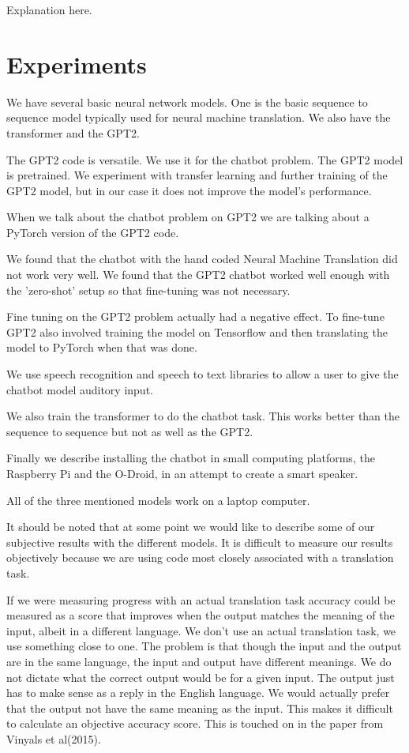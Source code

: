 Explanation here.

\section{Experiments}

We have several basic neural network models. One is the basic sequence
to sequence model typically used for neural machine translation. We also have the transformer and
the GPT2.

The GPT2 code is versatile. We use it for the chatbot problem. The GPT2 model
is pretrained. We experiment with transfer learning and further training of the GPT2 model, but
in our case it does not improve the model's performance. 

When we talk about the chatbot problem on GPT2 we are talking about a PyTorch version of the 
GPT2 code. 

We found that the chatbot with the hand coded Neural Machine Translation did not work 
very well. We found that the GPT2 chatbot worked well enough with the 'zero-shot' setup so that
fine-tuning was not necessary. 

Fine tuning on the GPT2 problem actually had a negative effect. To fine-tune GPT2 also involved
training the model on Tensorflow and then translating the model to PyTorch when that was done. 

We use speech recognition and speech to text libraries to allow a user to give the chatbot model 
auditory input.

We also train the transformer to do the chatbot task. This works better than the sequence to 
sequence but not as well as the GPT2.

Finally we describe installing the chatbot in small computing platforms, the Raspberry Pi and the O-Droid, in an attempt to create a smart speaker.

All of the three mentioned models work on a laptop computer.

It should be noted that at some point we would like to describe some of our subjective
results with the different models. It is difficult to measure our results objectively because we
are using code most closely associated with a translation task. 

If we were measuring progress with an actual translation task accuracy could be measured as a score that improves when the output matches the meaning of the input, albeit in a different language. We don't use an actual translation
task, we use something close to one. The problem is that though the input 
and the output are in the same language, the input and output have different meanings. We
do not dictate what the correct output would be for a given input. The output just has to make sense as a reply in the English language. We would actually prefer that the output not have the
same meaning as the input. This makes it difficult to calculate an objective accuracy score. This
is touched on in the paper from Vinyals et al(2015)\cite{DBLP:journals/corr/VinyalsL15}.

